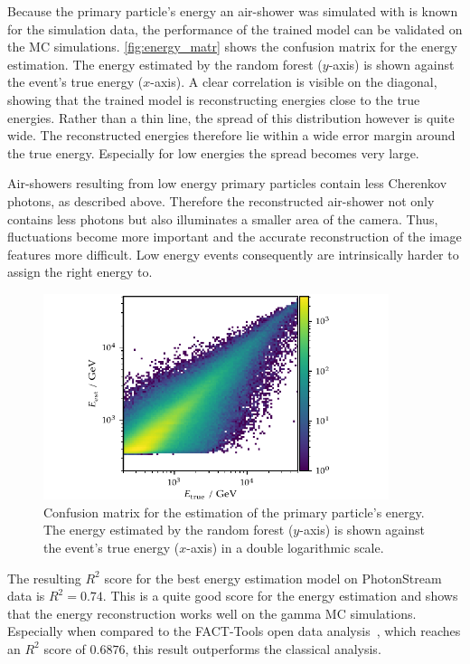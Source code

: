 Because the primary particle's energy an air-shower was simulated with is known
for the simulation data, the performance of the trained model can be
validated on the MC simulations. \autoref{fig:energy_matr} shows the confusion
matrix for the energy estimation. The energy estimated by the random forest
($y$-axis) is shown against the event's true energy ($x$-axis). A clear
correlation is visible on the diagonal, showing that the trained model is
reconstructing energies close to the true energies. Rather than a thin line,
the spread of this distribution however is quite wide. The reconstructed
energies therefore lie within a wide error margin around the true energy.
Especially for low energies the spread becomes very large.

Air-showers resulting from low energy primary particles contain less Cherenkov
photons, as described above. Therefore the reconstructed air-shower not only
contains less photons but also illuminates a smaller area of the camera. Thus,
fluctuations become more important and the accurate reconstruction of the image
features more difficult. Low energy events consequently are intrinsically
harder to assign the right energy to.
%
\begin{figure}
  \centering
  \includegraphics[width=0.9\textwidth]{Plots/results/DBSCAN/energy_migration.pdf}
  \caption{Confusion matrix for the estimation of the primary particle's energy. The energy estimated by the random forest ($y$-axis) is shown against the event's true energy ($x$-axis) in a double logarithmic scale.}
  \label{fig:energy_matr}
\end{figure}
%
The resulting $R^2$ score for the best energy estimation model on PhotonStream
data is $R^2 = 0.74$. This is a quite good score for the energy estimation and
shows that the energy reconstruction works well on the gamma MC simulations.
Especially when compared to the FACT-Tools open data analysis~\cite{openana},
which reaches an $R^2$ score of $0.6876$, this result outperforms the
classical analysis.
%



